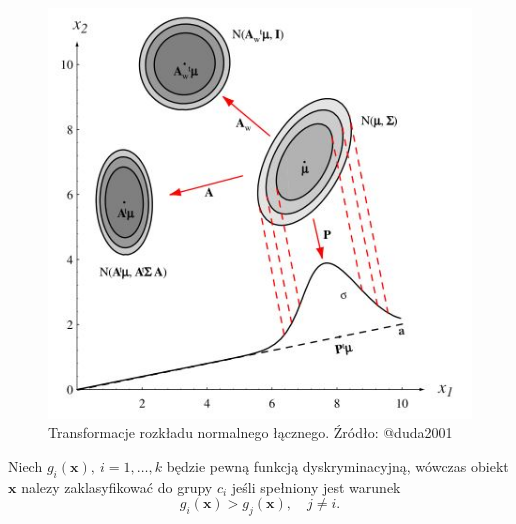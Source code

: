 \documentclass[]{book}
\theoremstyle{plain}
\theoremstyle{definition}
\theoremstyle{definition}
\theoremstyle{definition}
\theoremstyle{definition}
\theoremstyle{remark}
\let\BeginKnitrBlock\begin \let\EndKnitrBlock\end
\begin{document}
\begin{figure}

{\centering \includegraphics{images/transform} 

}

\caption{Transformacje rozkładu normalnego łącznego. Źródło: @duda2001}\label{fig:trans}
\end{figure}

\BeginKnitrBlock{definition}
\protect\hypertarget{def:unnamed-chunk-60}{}{\label{def:unnamed-chunk-60} }Niech \(g_i(\boldsymbol{x}),\ i=1,\ldots,k\) będzie pewną funkcją dyskryminacyjną, wówczas obiekt \(\boldsymbol{x}\) nalezy zaklasyfikować do grupy \(c_i\) jeśli spełniony jest warunek
\begin{equation}
    g_i(\boldsymbol{x})>g_j(\boldsymbol{x}), \quad j\neq i.
\end{equation}
\EndKnitrBlock{definition}
\end{document}
